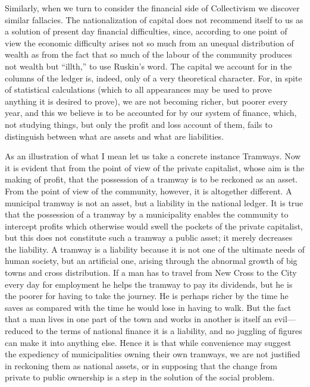 \documentclass{book}
\begin{document}
Similarly, when we turn to consider the financial side of Collectivism we discover similar fallacies. The nationalization of capital does not recommend itself to us as a solution of present day financial difficulties, since, according to one point of view the economic difficulty arises not so much from an unequal distribution of wealth as from the fact that so much of the labour of the community produces not wealth but “illth,” to use Ruskin’s word. The capital we account for in the columns of the ledger is, indeed, only of a very theoretical character. For, in spite of statistical calculations (which to all appearances may be used to prove anything it is desired to prove), we are not becoming richer, but poorer every year, and this we believe is to be accounted for by our system of finance, which, not studying things, but only the profit and loss account of them, fails to distinguish between what are assets and what are liabilities.

As an illustration of what I mean let us take a concrete instance Tramways. Now it is evident that from the point of view of the private capitalist, whose aim is the making of profit, that the possession of a tramway is to be reckoned as an asset. From the point of view of the community, however, it is altogether different. A municipal tramway is not an asset, but a liability in the national ledger. It is true that the possession of a tramway by a municipality enables the community to intercept profits which otherwise would swell the pockets of the private capitalist, but this does not constitute such a tramway a public asset; it merely decreases the liability. A tramway is a liability because it is not one of the ultimate needs of human society, but an artificial one, arising through the abnormal growth of big towns and cross distribution. If a man has to travel from New Cross to the City every day for employment he helps the tramway to pay its dividends, but he is the poorer for having to take the journey. He is perhaps richer by the time he saves as compared with the time he would lose in having to walk. But the fact that a man lives in one part of the town and works in another is itself an evil—reduced to the terms of national finance it is a liability, and no juggling of figures can make it into anything else. Hence it is that while convenience may suggest the expediency of municipalities owning their own tramways, we are not justified in reckoning them as national assets, or in supposing that the change from private to public ownership is a step in the solution of the social problem.
\end{document}
